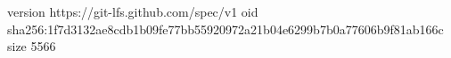 version https://git-lfs.github.com/spec/v1
oid sha256:1f7d3132ae8cdb1b09fe77bb55920972a21b04e6299b7b0a77606b9f81ab166c
size 5566
